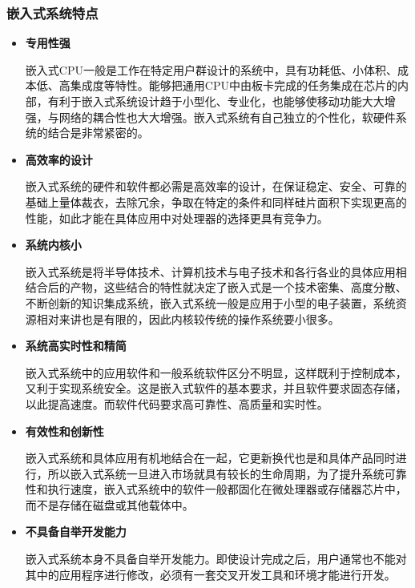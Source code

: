 \documentclass[12pt, a4paper]{article}
\begin{document}
	\subsubsection{嵌入式系统特点}
	\begin{itemize}
	\item  \textbf{专用性强}
	
	嵌入式CPU一般是工作在特定用户群设计的系统中，具有功耗低、小体积、成本低、高集成度等特性。能够把通用CPU中由板卡完成的任务集成在芯片的内部，有利于嵌入式系统设计趋于小型化、专业化，也能够使移动功能大大增强，与网络的耦合性也大大增强。嵌入式系统有自己独立的个性化，软硬件系统的结合是非常紧密的。
	
	\item \textbf{高效率的设计}
	
	嵌入式系统的硬件和软件都必需是高效率的设计，在保证稳定、安全、可靠的基础上量体裁衣，去除冗余，争取在特定的条件和同样硅片面积下实现更高的性能，如此才能在具体应用中对处理器的选择更具有竞争力。
	
	\item \textbf{系统内核小}
	
	嵌入式系统是将半导体技术、计算机技术与电子技术和各行各业的具体应用相结合后的产物，这些结合的特性就决定了嵌入式是一个技术密集、高度分散、不断创新的知识集成系统，嵌入式系统一般是应用于小型的电子装置，系统资源相对来讲也是有限的，因此内核较传统的操作系统要小很多。
	
	\item \textbf{系统高实时性和精简}
	
	嵌入式系统中的应用软件和一般系统软件区分不明显，这样既利于控制成本，又利于实现系统安全。这是嵌入式软件的基本要求，并且软件要求固态存储，以此提高速度。而软件代码要求高可靠性、高质量和实时性。
	
	\item \textbf{有效性和创新性}
	
	嵌入式系统和具体应用有机地结合在一起，它更新换代也是和具体产品同时进行，所以嵌入式系统一旦进入市场就具有较长的生命周期，为了提升系统可靠性和执行速度，嵌入式系统中的软件一般都固化在微处理器或存储器芯片中，而不是存储在磁盘或其他载体中。
	
	\item \textbf{不具备自举开发能力}  
	
	嵌入式系统本身不具备自举开发能力。即使设计完成之后，用户通常也不能对其中的应用程序进行修改，必须有一套交叉开发工具和环境才能进行开发。
	\end{itemize}
\end{document}
